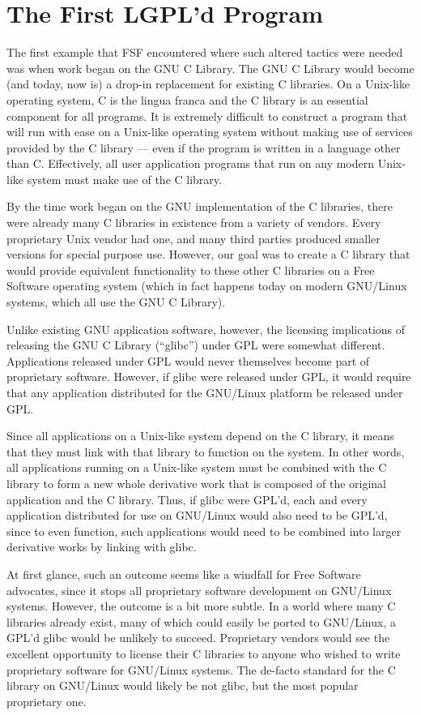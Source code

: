 \section{The First LGPL'd Program}

The first example that FSF encountered where such altered tactics were
needed was when work began on the GNU C Library. The GNU C Library would
become (and today, now is) a drop-in replacement for existing C libraries.
On a Unix-like operating system, C is the lingua franca and the C library
is an essential component for all programs. It is extremely difficult to
construct a program that will run with ease on a Unix-like operating
system without making use of services provided by the C library --- even
if the program is written in a language other than C\@. Effectively, all
user application programs that run on any modern Unix-like system must
make use of the C library.

By the time work began on the GNU implementation of the C libraries, there
were already many C libraries in existence from a variety of vendors.
Every proprietary Unix vendor had one, and many third parties produced
smaller versions for special purpose use. However, our goal was to create
a C library that would provide equivalent functionality to these other C
libraries on a Free Software operating system (which in fact happens today
on modern GNU/Linux systems, which all use the GNU C Library).

Unlike existing GNU application software, however, the licensing
implications of releasing the GNU C Library (``glibc'') under GPL were
somewhat different. Applications released under GPL would never
themselves become part of proprietary software. However, if glibc were
released under GPL, it would require that any application distributed for
the GNU/Linux platform be released under GPL\@.

Since all applications on a Unix-like system depend on the C library, it
means that they must link with that library to function on the system. In
other words, all applications running on a Unix-like system must be
combined with the C library to form a new whole derivative work that is
composed of the original application and the C library. Thus, if glibc
were GPL'd, each and every application distributed for use on GNU/Linux
would also need to be GPL'd, since to even function, such applications
would need to be combined into larger derivative works by linking with
glibc.

At first glance, such an outcome seems like a windfall for Free Software
advocates, since it stops all proprietary software development on
GNU/Linux systems. However, the outcome is a bit more subtle. In a world
where many C libraries already exist, many of which could easily be ported
to GNU/Linux, a GPL'd glibc would be unlikely to succeed. Proprietary
vendors would see the excellent opportunity to license their C libraries
to anyone who wished to write proprietary software for GNU/Linux systems.
The de-facto standard for the C library on GNU/Linux would likely be not
glibc, but the most popular proprietary one.

